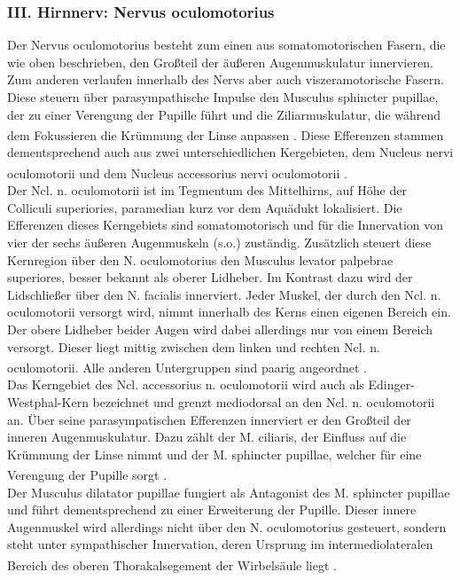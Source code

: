 \documentclass[12pt,a4paper,pdftex]{article}
\begin{document}
\subsubsection*{III. Hirnnerv: Nervus oculomotorius} 
Der Nervus oculomotorius besteht zum einen aus somatomotorischen Fasern, die wie oben beschrieben, den Großteil der äußeren Augenmuskulatur innervieren. Zum anderen verlaufen innerhalb des Nervs aber auch viszeramotorische Fasern. Diese steuern über parasympathische Impulse den Musculus sphincter pupillae, der zu einer Verengung der Pupille führt und die Ziliarmuskulatur, die während dem Fokussieren die Krümmung der Linse anpassen \textsuperscript{\cite[39]{kandel2013principles}}. Diese Efferenzen stammen dementsprechend auch aus zwei unterschiedlichen Kergebieten, dem Nucleus nervi oculomotorii   und dem Nucleus accessorius nervi oculomotorii  \textsuperscript{\cite[5]{trepel2011neuroanatomie}}. \\  
Der Ncl. n. oculomotorii ist im Tegmentum des Mittelhirns, auf Höhe der Colliculi superiories, paramedian kurz vor dem Aquädukt lokalisiert. Die Efferenzen dieses Kerngebiets sind somatomotorisch und für die Innervation von vier der sechs äußeren Augenmuskeln (s.o.) zuständig. Zusätzlich steuert diese Kernregion über den N. oculomotorius den Musculus levator palpebrae superiores, besser bekannt als oberer Lidheber. Im Kontrast dazu wird der Lidschließer über den N. facialis innerviert. Jeder Muskel, der durch den Ncl. n. oculomotorii versorgt wird, nimmt innerhalb des Kerns einen eigenen Bereich ein. Der obere Lidheber beider Augen wird dabei allerdings nur von einem Bereich versorgt. Dieser liegt mittig zwischen dem linken und rechten Ncl. n. oculomotorii. Alle anderen Untergruppen sind paarig angeordnet \textsuperscript{\cite[5]{trepel2011neuroanatomie}}. \\
Das Kerngebiet des Ncl. accessorius n. oculomotorii wird auch als Edinger-Westphal-Kern bezeichnet und grenzt mediodorsal an den Ncl. n. oculomotorii an. Über seine parasympatischen Efferenzen innerviert er den Großteil der inneren Augenmuskulatur. Dazu zählt der M. ciliaris, der Einfluss auf die Krümmung der Linse nimmt und der M. sphincter pupillae, welcher für eine Verengung der Pupille sorgt \textsuperscript{\cite[5]{trepel2011neuroanatomie}}. \\          
Der Musculus dilatator pupillae fungiert als Antagonist des M. sphincter pupillae und führt dementsprechend zu einer Erweiterung der Pupille. Dieser innere Augenmuskel wird allerdings nicht über den N. oculomotorius gesteuert, sondern steht unter sympathischer Innervation, deren Ursprung im intermediolateralen Bereich des oberen Thorakalsegement der Wirbelsäule liegt \textsuperscript{\cite[39]{kandel2013principles}}.
\end{document}
